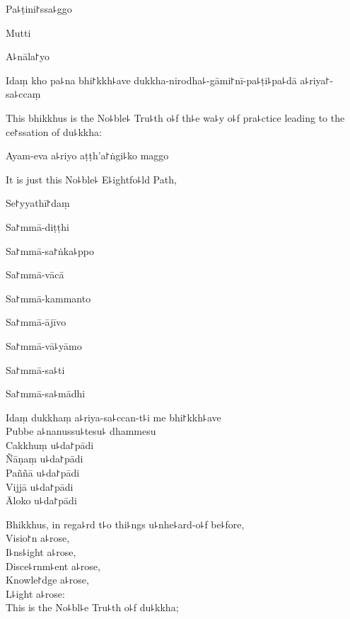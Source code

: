 Pa꜕ṭini꜓ssa꜕ggo


Mutti


A꜕nāla꜓yo


Idaṃ kho pa꜕na bhi꜓kkh꜕ave dukkha-nirodha꜕-gāmi꜓nī-pa꜕ṭi꜕pa꜕dā a꜕riya꜓-sa꜕ccaṃ

\begin{english}
  This bhikkhus is the No꜕ble꜕ Tru꜕th o꜕f th꜕e wa꜕y o꜕f pra꜕ctice leading to the ce꜓ssation of du꜕kkha:
\end{english}

Ayam-eva a꜕riyo aṭṭh'a꜓ṅgi꜕ko maggo

\begin{english}
  It is just this No꜕ble꜕ E꜕ightfo꜕ld Path,
\end{english}

Se꜓yyathī꜓daṃ


Sa꜓mmā-diṭṭhi


Sa꜓mmā-sa꜓ṅka꜕ppo


Sa꜓mmā-vācā


Sa꜓mmā-kammanto


Sa꜓mmā-ājīvo


Sa꜓mmā-vā꜕yāmo


Sa꜓mmā-sa꜕ti


Sa꜓mmā-sa꜕mādhi


Idaṃ dukkhaṃ a꜕riya-sa꜕ccan-t꜕i me bhi꜓kkh꜕ave\\
Pubbe a꜕nanussu꜕tesu꜕ dhammesu\\
Cakkhuṃ u꜕da꜓pādi\\
Ñāṇaṃ u꜕da꜓pādi\\
Paññā u꜕da꜓pādi\\
Vijjā u꜕da꜓pādi\\
Āloko u꜕da꜓pādi

\begin{english}
  Bhikkhus, in rega꜕rd t꜕o thi꜕ngs u꜕nhe꜕ard-o꜕f be꜕fore,\\
  Visio꜓n a꜕rose,\\
  I꜕ns꜕ight a꜕rose,\\
  Disce꜕rnm꜕ent a꜕rose,\\
  Knowle꜓dge a꜕rose,\\
  L꜕ight a꜕rose:\\
  This is the No꜕bl꜕e Tru꜕th o꜕f du꜕kkha;
\end{english}

